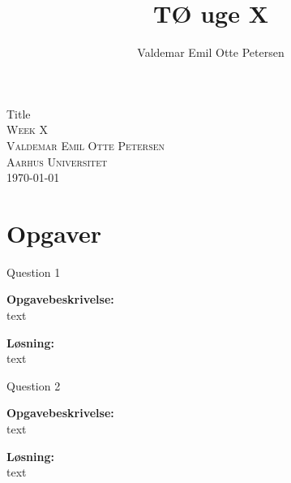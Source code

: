 \documentclass{article}
\author{Valdemar Emil Otte Petersen}
\title{TØ uge X}
\begin{document}
\begingroup

\centering 
{\LARGE Title}\\ %
\vspace*{1\baselineskip}
\scshape
Week X\\ %
Valdemar Emil Otte Petersen\\ %
{\small Aarhus Universitet}\\ 
{\small \today}

\endgroup

\section{Opgaver}
\LARGE{Question 1}

\textbf{Opgavebeskrivelse:}\\
text

\vspace{15px}
\textbf{Løsning:}\\
text

\vspace{35px}
\LARGE{Question 2}

\textbf{Opgavebeskrivelse:}\\
text

\vspace{15px}
\textbf{Løsning:}\\
text
\end{document}
